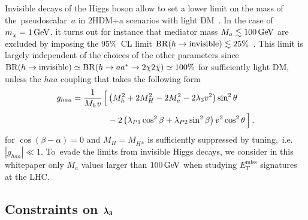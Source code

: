 \documentclass[a4paper, 11pt,notoc]{article}
\newcommand{\MET}{\ensuremath{E_T^\mathrm{miss}}\xspace}
\newcommand{\hdma}{\ensuremath{\textrm{2HDM+a}}\xspace}
\def\bm#1{\mbox{\boldmath$#1$\unboldmath}}
\begin{document}
Invisible decays of the Higgs boson allow to set a lower limit on the mass of  the~pseudoscalar~$a$ in \hdma scenarios with light DM~\cite{Bauer:2017ota}. In the case of $m_\chi = 1 \, {\rm GeV}$, it turns out for instance that mediator mass $M_a \lesssim 100 \, {\rm GeV}$ are excluded by imposing the 95\%~CL limit ${\rm BR} (h \to  \text{invisible}) \lesssim 25\%$~\cite{Aad:2015pla,Khachatryan:2016whc}.  This limit is largely independent of the choices of the other parameters since ${\rm BR} (h \to  \text{invisible}) \simeq {\rm BR} (h \to a a^\ast \to 2 \chi 2 \bar \chi) \simeq 100\%$ for sufficiently light DM, unless  the $haa$ coupling that   takes the following form~\cite{Bauer:2017ota}
\begin{equation}
\begin{split}
g_{haa} & = \frac{1}{M_h v}  \, \Big [ \left ( M_h^2  + 2 M_H^2  -  2 M_a^2 - 2 \lambda_3 v^2 \right) \sin^2 \theta \\[1mm] &  \hspace{1.5cm} - 2 \left (  \lambda_{P1} \cos^2 \beta + \lambda_{P2} \sin^2 \beta  \right ) v^2 \cos^2 \theta \, \Big ]  \,, 
\end{split}
\end{equation}
for $\cos (\beta-\alpha) = 0$ and $M_H = M_{H^\pm}$ is sufficiently suppressed by tuning,~i.e.~$|g_{haa}| \ll 1$. To~evade the limits from invisible Higgs decays, we consider in this whitepaper only $M_a$ values larger than $100 \, {\rm GeV}$ when studying $\MET$ signatures at the LHC. 

\subsection*{Constraints on $\bm{\lambda_3}$}
\end{document}
